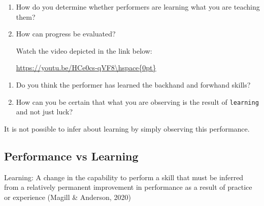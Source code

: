 \documentclass[
  letterpaper,
  DIV=11,
  numbers=noendperiod]{scrartcl}
\providecommand{\tightlist}{%
  \setlength{\itemsep}{0pt}\setlength{\parskip}{0pt}}\usepackage{longtable,booktabs,array}
\begin{document}
\begin{enumerate}
\def\labelenumi{\arabic{enumi}.}
\item
  How do you determine whether performers are learning what you are
  teaching them?\hspace{0pt}
\item
  How can progress be evaluated?

  Watch the video depicted in the link below:

  \url{https://youtu.be/HCe0cs-qVF8\hspace{0pt}}
\end{enumerate}

\begin{tcolorbox}[enhanced jigsaw, opacitybacktitle=0.6, coltitle=black, colbacktitle=quarto-callout-tip-color!10!white, bottomtitle=1mm, arc=.35mm, colframe=quarto-callout-tip-color-frame, left=2mm, bottomrule=.15mm, toprule=.15mm, toptitle=1mm, breakable, opacityback=0, titlerule=0mm, title=\textcolor{quarto-callout-tip-color}{\faLightbulb}\hspace{0.5em}{Concerning the video above}, rightrule=.15mm, leftrule=.75mm, colback=white]

\begin{enumerate}
\def\labelenumi{\arabic{enumi}.}
\tightlist
\item
  Do you think the performer has learned the backhand and forwhand
  skills?
\item
  How can you be certain that what you are observing is the result of
  \texttt{learning} and not just luck?\hspace{0pt}
\end{enumerate}

\end{tcolorbox}

It is not possible to infer about learning by simply observing this
performance.

\hypertarget{performance-vs-learning}{%
\subsection{Performance vs Learning}\label{performance-vs-learning}}

\begin{tcolorbox}[enhanced jigsaw, opacitybacktitle=0.6, coltitle=black, colbacktitle=quarto-callout-note-color!10!white, bottomtitle=1mm, arc=.35mm, colframe=quarto-callout-note-color-frame, left=2mm, bottomrule=.15mm, toprule=.15mm, toptitle=1mm, breakable, opacityback=0, titlerule=0mm, title=\textcolor{quarto-callout-note-color}{\faInfo}\hspace{0.5em}{Note}, rightrule=.15mm, leftrule=.75mm, colback=white]

Learning: A change in the capability to perform a skill that must be
inferred from a relatively permanent improvement in performance as a
result of practice or experience (Magill \& Anderson, 2020)

\end{tcolorbox}
\end{document}
